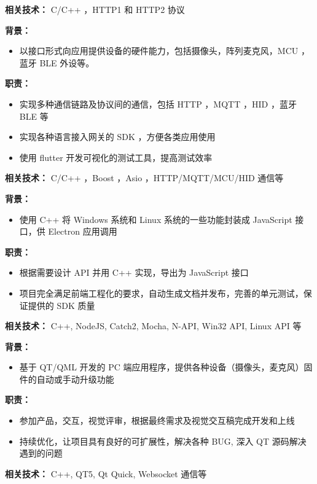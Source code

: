 \documentclass{resume}
\begin{document}
\textbf{ 相关技术： } C/C++ ，HTTP1 和 HTTP2 协议

\textbf{ 背景： }
\begin{itemize}
  \item 以接口形式向应用提供设备的硬件能力，包括摄像头，阵列麦克风，MCU ，蓝牙 BLE 外设等。
\end{itemize}
\textbf{ 职责： }
\begin{itemize}
  \item 实现多种通信链路及协议间的通信，包括 HTTP ，MQTT ，HID ，蓝牙 BLE 等
  \item 实现各种语言接入网关的 SDK ，方便各类应用使用
  \item 使用 flutter 开发可视化的测试工具，提高测试效率
\end{itemize}

\textbf{ 相关技术： } C/C++ ，Boost ，Asio ，HTTP/MQTT/MCU/HID 通信等

\textbf{ 背景： }
\begin{itemize}
  \item 使用 C++ 将 Windows 系统和 Linux 系统的一些功能封装成 JavaScript 接口，供 Electron 应用调用
\end{itemize}
\textbf{ 职责： }
\begin{itemize}
  \item 根据需要设计 API 并用 C++ 实现，导出为 JavaScript 接口
  \item 项目完全满足前端工程化的要求，自动生成文档并发布，完善的单元测试，保证提供的 SDK 质量
\end{itemize}

\textbf{ 相关技术： } C++, NodeJS, Catch2, Mocha, N-API, Win32 API, Linux API 等


\textbf{ 背景： }
\begin{itemize}
  \item 基于 QT/QML 开发的 PC 端应用程序，提供各种设备（摄像头，麦克风）固件的自动或手动升级功能
\end{itemize}
\textbf{ 职责： }
\begin{itemize}
  \item 参加产品，交互，视觉评审，根据最终需求及视觉交互稿完成开发和上线
  \item 持续优化，让项目具有良好的可扩展性，解决各种 BUG, 深入 QT 源码解决遇到的问题
\end{itemize}

\textbf{ 相关技术： } C++, QT5, Qt Quick, Websocket 通信等
\end{document}
